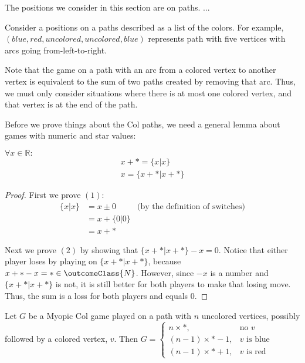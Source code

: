 \documentclass[letter,10pt]{article}
\begin{document}
The positions we consider in this section are on paths. ...

Consider a positions on a paths described as a list of the colors.  For example, $(blue, red, uncolored, uncolored, blue)$ represents path with five vertices with arcs going from-left-to-right.

Note that the game on a path with an arc from a colored vertex to another vertex is equivalent to the sum of two paths created by removing that arc.  Thus, we must only consider situations where there is at most one colored vertex, and that vertex is at the end of the path.

Before we prove things about the Col paths, we need a general lemma about games with numeric and star values:

\begin{lemma}
\label{lem:numbersPlusStar}
  $\forall x \in \mathbb{R}:$
  \begin{align}
    x + * = \{x | x\}\\
    x = \{x + * | x + *\}
  \end{align}
\end{lemma}
\begin{proof}
  First we prove $(1)$: 
  \begin{align*}
    \{ x | x \} & = x \pm 0 & \mbox{(by the definition of switches)} \\
    & = x + \{0|0\}\\
    & = x + *
  \end{align*}
  
  Next we prove $(2)$ by showing that $\{x + * | x + *\} - x = 0$. Notice that either player loses by playing on $\{x + * | x + *\}$, because $x + * - x = * \in \outcomeClass{N}$.  However, since $- x$ is a number and $\{x + * | x + *\}$ is not, it is still better for both players to make that losing move.  Thus, the sum is a loss for both players and equals $0$.
\end{proof}

\begin{lemma}\label{lem:pathMyopicColValues}
  Let $G$ be a Myopic Col game played on a path with $n$ uncolored vertices, possibly followed by a colored vertex, $v$.  Then $G = 
  \begin{cases}
    n \times *, & \mbox{no } v\\
    (n-1) \times * - 1, & v\mbox{ is blue}\\
    (n-1) \times * + 1, & v\mbox{ is red}
  \end{cases}$
  
\end{lemma}
\end{document}
